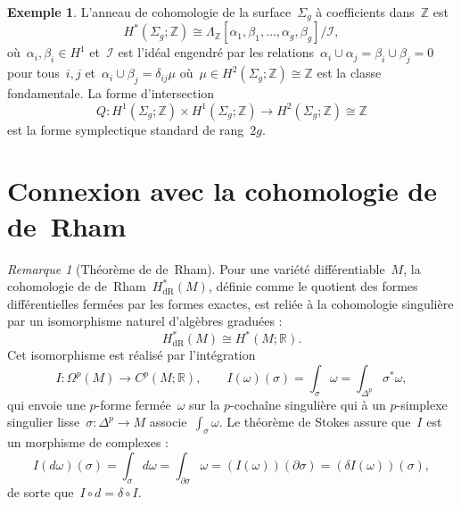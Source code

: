 \documentclass[12pt,a4paper,openany]{book}
\theoremstyle{definition}
\newtheorem{exemple}[definition]{Exemple}
\theoremstyle{plain}
\theoremstyle{remark}
\newtheorem{remarque}[definition]{Remarque}
\newcommand{\Z}{\mathbb{Z}}
\newcommand{\R}{\mathbb{R}}
\begin{document}
\begin{exemple}\label{ex:sigma-g-cohomologie}
L'anneau de cohomologie de la surface~$\Sigma_g$ à coefficients dans~$\Z$ est
\[
  H^*(\Sigma_g; \Z) \cong \Lambda_\Z[\alpha_1, \beta_1, \ldots, \alpha_g, \beta_g]
  \Big/ \mathcal{I},
\]
où~$\alpha_i, \beta_i \in H^1$ et~$\mathcal{I}$ est l'idéal engendré par les
relations~$\alpha_i \cup \alpha_j = \beta_i \cup \beta_j = 0$ pour tous~$i, j$
et~$\alpha_i \cup \beta_j = \delta_{ij} \mu$ où~$\mu \in H^2(\Sigma_g;\Z) \cong \Z$
est la classe fondamentale. La forme d'intersection
\[
  Q \colon H^1(\Sigma_g;\Z) \times H^1(\Sigma_g;\Z) \to H^2(\Sigma_g;\Z) \cong \Z
\]
est la forme symplectique standard de rang~$2g$.
\end{exemple}

\section{Connexion avec la cohomologie de de~Rham}\label{sec:de-rham}

\begin{remarque}[Théorème de de~Rham]\label{rem:de-rham}
Pour une variété différentiable~$M$, la cohomologie de de~Rham~$H^*_{\mathrm{dR}}(M)$,
définie comme le quotient des formes différentielles fermées par les formes exactes,
est reliée à la cohomologie singulière par un isomorphisme naturel d'algèbres graduées :
\[
  H^*_{\mathrm{dR}}(M) \cong H^*(M; \R).
\]
Cet isomorphisme est réalisé par l'intégration
\[
  I \colon \Omega^p(M) \longrightarrow C^p(M; \R), \qquad
  I(\omega)(\sigma) = \int_\sigma \omega = \int_{\Delta^p} \sigma^* \omega,
\]
qui envoie une $p$-forme fermée~$\omega$ sur la $p$-cochaîne singulière qui à un
$p$-simplexe singulier lisse~$\sigma \colon \Delta^p \to M$ associe~$\int_\sigma \omega$.
Le théorème de Stokes assure que~$I$ est un morphisme de
complexes :
\[
  I(d\omega)(\sigma) = \int_\sigma d\omega = \int_{\partial \sigma} \omega
  = (I(\omega))(\partial \sigma) = (\delta I(\omega))(\sigma),
\]
de sorte que~$I \circ d = \delta \circ I$.
\end{remarque}
\end{document}
